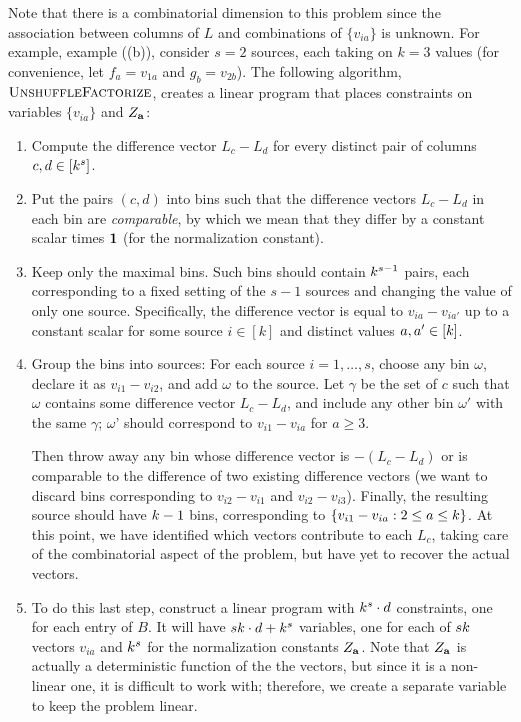 Note that there is a combinatorial dimension to this problem since the association between
columns of $L$ and combinations of $\{ v_{ia} \}$ is unknown.
For example, example ((b)),
consider $s=2$ sources, each taking on $k=3$ values
(for convenience, let $f_a = v_{1a}$ and $g_b = v_{2b}$).
The following algorithm, $\text{\sc UnshuffleFactorize}$,
creates a linear program that places constraints on
variables $\{v_{ia}\}$ and $Z_{\mathbf{a}}$:
\begin{enumerate}

\item Compute the difference vector $L_c - L_d$ for every distinct pair of
columns $c,d \in [k^s]$.

\item Put the pairs $(c,d)$ into bins such that the difference vectors $L_c-L_d$
in each bin are \emph{comparable}, by which we mean that they
differ by a constant scalar times $\mathbf{1}$ (for the normalization constant).

\item Keep only the maximal bins.
Such bins should contain $k^{s-1}$ pairs, each corresponding to a fixed
setting of the $s-1$ sources
and changing the value of only one source.
Specifically, the difference vector is equal to $v_{ia} - v_{ia'}$ up to a
constant scalar for some source $i \in [k]$ and distinct values $a, a' \in
[k]$.

\item Group the bins into sources:
  For each source $i = 1, \dots, s$,
  choose any bin $\omega$, declare it as $v_{i1} - v_{i2}$,
  and add $\omega$ to the source.
  Let $\gamma$ be the set of $c$ such that $\omega$
  contains some difference vector $L_c - L_d$,
  and include any other bin $\omega'$ with the same $\gamma$;
  $\omega$' should correspond to $v_{i1} - v_{ia}$ for $a \ge 3$.

  Then throw away any bin whose difference vector is $-(L_c - L_d)$
  or is comparable to the difference of two existing difference vectors
  (we want to discard bins corresponding to $v_{i2} - v_{i1}$ and $v_{i2} - v_{i3}$).
  Finally, the resulting source should have $k-1$ bins, corresponding to $\{ v_{i1} - v_{ia} : 2 \le a \le k \}$.
  At this point, we have identified which vectors contribute to each $L_c$,
  taking care of the combinatorial aspect of the problem,
  but have yet to recover the actual vectors.

  \item To do this last step, construct a linear program with $k^s \cdot d$ constraints, one for each entry of $B$.
  It will have $sk \cdot d + k^s$ variables,
  one for each of $sk$ vectors $v_{ia}$ and $k^s$ for the normalization constants $Z_{\mathbf{a}}$.
  Note that $Z_{\mathbf{a}}$ is actually a deterministic function of the the vectors, but since it is a non-linear one,
  it is difficult to work with; therefore, we create a separate variable to keep the problem linear.

\end{enumerate}

